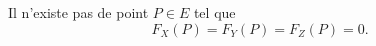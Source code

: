 
\begin{lemme}
    Il n'existe pas de point $P \in E$ tel que
    \[
    F_{X}(P) = F_{Y}(P) = F_{Z}(P) = 0
    .\] 
\end{lemme}

\begin{demonstration}
    
\end{demonstration}
